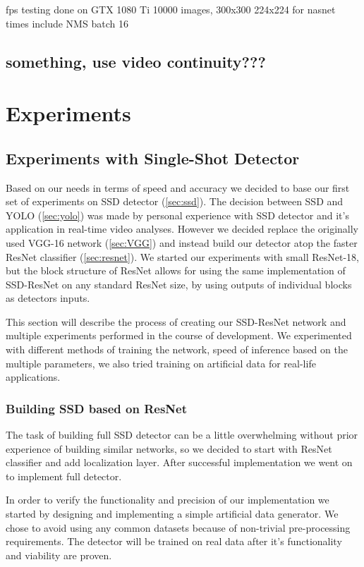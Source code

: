 fps
testing done on GTX 1080 Ti
10000 images, 300x300 
224x224 for nasnet
times include NMS
batch 16


\section{something, use video continuity???}





\chapter*{Experiments}
\section{Experiments with Single-Shot Detector}
\label{chapt:experiments}
Based on our needs in terms of speed and accuracy we decided to base our first set of experiments on SSD detector (\cref{sec:ssd}). The decision between SSD and YOLO (\cref{sec:yolo}) was made by personal experience with SSD detector and it's application in real-time video analyses. However we decided replace the originally used VGG-16 network (\cref{sec:VGG}) and instead build our detector atop the faster ResNet classifier (\cref{sec:resnet}). We started our experiments with small ResNet-18, but the block structure of ResNet allows for using the same implementation of SSD-ResNet on any standard ResNet size, by using outputs of individual blocks as detectors inputs.

This section will describe the process of creating our SSD-ResNet network and multiple experiments performed in the course of development. We experimented with different methods of training the network, speed of inference based on the multiple parameters, we also tried training on artificial data for real-life applications.


\subsection{Building SSD based on ResNet}
The task of building full SSD detector can be a little overwhelming without prior experience of building similar networks, so we decided to start with ResNet classifier and add localization layer. After successful implementation we went on to implement full detector. 

In order to verify the functionality and precision of our implementation we started by designing and implementing a simple artificial data generator. We chose to avoid using any common datasets because of non-trivial pre-processing requirements. The detector will be trained on real data after it's functionality and viability are proven.

